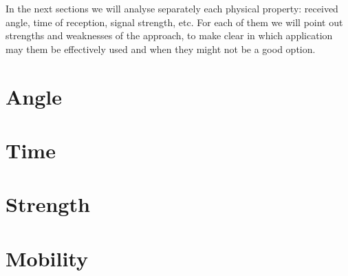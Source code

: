 \documentclass[conference]{IEEEtran}
\begin{document}
In the next sections we will analyse separately each physical property: received angle, time of reception, signal strength, etc. For each of them we will point out strengths and weaknesses of the approach, to make clear in which application may them be effectively used and when they might not be a good option.

\section{Angle}


\section{Time}


\section{Strength}


\section{Mobility}

\end{document}
